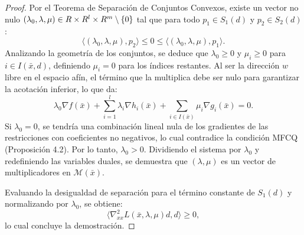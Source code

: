 \begin{proof}
 Por el Teorema de Separación de Conjuntos Convexos, existe un vector no nulo $(\lambda_0, \lambda, \mu) \in R \times R^l \times R^m \setminus \{0\}$ tal que para todo $p_1 \in S_1(d)$ y $p_2 \in S_2(d)$:
 \[
 \langle (\lambda_0, \lambda, \mu), p_2 \rangle \le 0 \le \langle (\lambda_0, \lambda, \mu), p_1 \rangle.
 \]
 Analizando la geometría de los conjuntos, se deduce que $\lambda_0 \ge 0$ y $\mu_i \ge 0$ para $i \in I(\bar{x}, d)$, definiendo $\mu_i = 0$ para los índices restantes. Al ser la dirección $w$ libre en el espacio afín, el término que la multiplica debe ser nulo para garantizar la acotación inferior, lo que da:
 \[
 \lambda_0 \nabla f(\bar{x}) + \sum_{i=1}^l \lambda_i \nabla h_i(\bar{x}) + \sum_{i \in I(\bar{x})} \mu_i \nabla g_i(\bar{x}) = 0.
 \]
 Si $\lambda_0 = 0$, se tendría una combinación lineal nula de los gradientes de las restricciones con coeficientes no negativos, lo cual contradice la condición MFCQ (Proposición 4.2). Por lo tanto, $\lambda_0 > 0$. Dividiendo el sistema por $\lambda_0$ y redefiniendo las variables duales, se demuestra que $(\lambda, \mu)$ es un vector de multiplicadores en $\mathcal{M}(\bar{x})$.
 
 Evaluando la desigualdad de separación para el término constante de $S_1(d)$ y normalizando por $\lambda_0$, se obtiene:
 \[
 \langle \nabla_{xx}^2 L(\bar{x}, \lambda, \mu)d, d \rangle \ge 0,
 \]
 lo cual concluye la demostración.
\end{proof}

